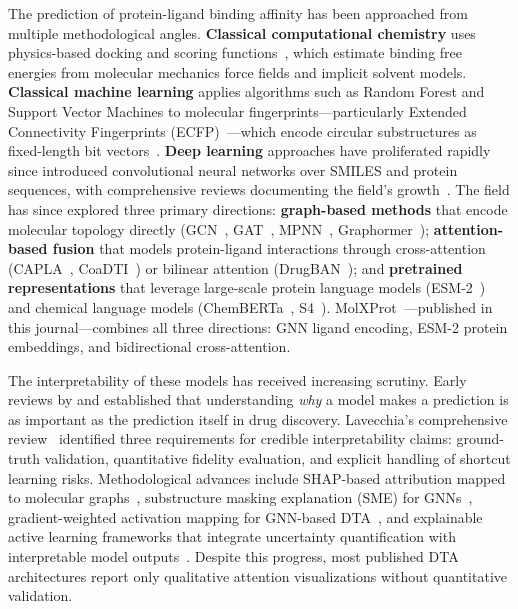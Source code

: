 \documentclass[11pt,twocolumn,a4paper]{article}
\begin{document}
The prediction of protein-ligand binding affinity has been approached from multiple methodological angles. \textbf{Classical computational chemistry} uses physics-based docking and scoring functions~\cite{kitchen2004docking}, which estimate binding free energies from molecular mechanics force fields and implicit solvent models. \textbf{Classical machine learning} applies algorithms such as Random Forest and Support Vector Machines to molecular fingerprints---particularly Extended Connectivity Fingerprints (ECFP)~\cite{rogers2010ecfp}---which encode circular substructures as fixed-length bit vectors~\cite{svetnik2003rf}. \textbf{Deep learning} approaches have proliferated rapidly since \cite{ozturk2018deepdta} introduced convolutional neural networks over SMILES and protein sequences, with comprehensive reviews documenting the field's growth~\cite{chen2018deeplearning}. The field has since explored three primary directions: \textbf{graph-based methods} that encode molecular topology directly (GCN~\cite{kipf2017gcn}, GAT~\cite{velickovic2018gat}, MPNN~\cite{gilmer2017mpnn}, Graphormer~\cite{ying2021graphormer}); \textbf{attention-based fusion} that models protein-ligand interactions through cross-attention (CAPLA~\cite{capla2023}, CoaDTI~\cite{coadti2022}) or bilinear attention (DrugBAN~\cite{attentionmgt2024}); and \textbf{pretrained representations} that leverage large-scale protein language models (ESM-2~\cite{lin2023esm2}) and chemical language models (ChemBERTa~\cite{ahmad2022chemberta}, S4~\cite{ozcelik2024s4}). MolXProt~\cite{cucco2026molxprot}---published in this journal---combines all three directions: GNN ligand encoding, ESM-2 protein embeddings, and bidirectional cross-attention.

The interpretability of these models has received increasing scrutiny. Early reviews by \cite{yang2019concepts} and \cite{jimenez2021ai} established that understanding \emph{why} a model makes a prediction is as important as the prediction itself in drug discovery. Lavecchia's comprehensive review~\cite{lavecchia2025xai} identified three requirements for credible interpretability claims: ground-truth validation, quantitative fidelity evaluation, and explicit handling of shortcut learning risks. Methodological advances include SHAP-based attribution mapped to molecular graphs~\cite{danel2020shap}, substructure masking explanation (SME) for GNNs~\cite{wang2023sme}, gradient-weighted activation mapping for GNN-based DTA~\cite{yang2022mgraphdta}, and explainable active learning frameworks that integrate uncertainty quantification with interpretable model outputs~\cite{srivastava2026explainable}. Despite this progress, most published DTA architectures report only qualitative attention visualizations without quantitative validation.
\end{document}
